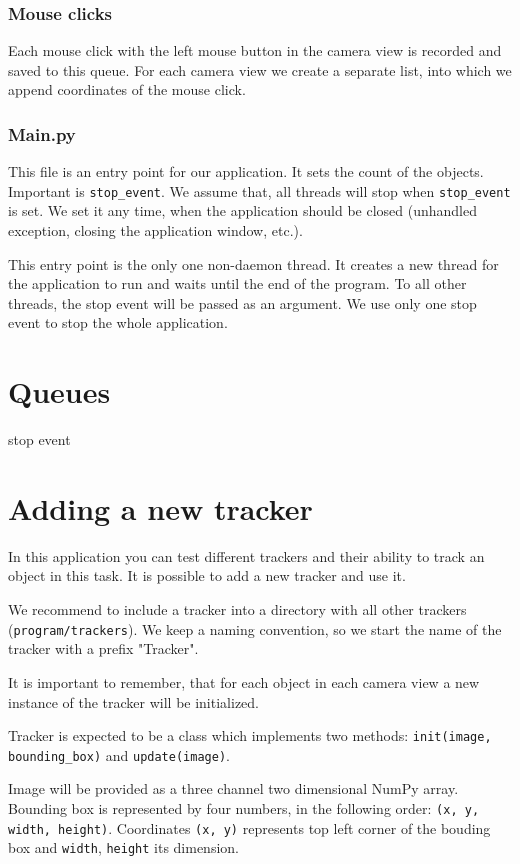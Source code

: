 \subsubsection{Mouse clicks}

Each mouse click with the left mouse button in the camera view is recorded and
saved to this queue. For each camera view we create a separate list, into which
we append coordinates of the mouse click.

\subsubsection*{Main.py}

This file is an entry point for our application. It sets the count of the
objects. Important is \verb+stop_event+. We assume that, all threads will stop
when \verb+stop_event+ is set. We set it any time, when the application should
be closed (unhandled exception, closing the application window, etc.).

This entry point is the only one non-daemon thread. It creates a new thread for
the application to run and waits until the end of the program. To all other
threads, the stop event will be passed as an argument. We use only one stop
event to stop the whole application.

\section{Queues}

stop event

\section{Adding a new tracker}
In this application you can test different trackers and their ability to track
an object in this task. It is possible to add a new tracker and use it.

We recommend to include a tracker into a directory with all other trackers
(\verb+program/trackers+). We keep a naming convention, so we start the name of
the tracker with a prefix "Tracker".

It is important to remember, that for each object in each camera view a new
instance of the tracker will be initialized.

Tracker is expected to be a class which implements two methods:
\verb+init(image, bounding_box)+ and \verb+update(image)+.

Image will be provided as a three channel two dimensional NumPy array. Bounding
box is represented by four numbers, in the following order:
\verb+(x, y, width, height)+. Coordinates \verb+(x, y)+ represents top left corner of the bouding
box and \verb+width+, \verb+height+ its dimension.

